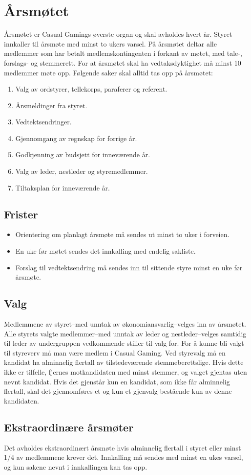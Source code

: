 \chapter{Årsmøtet}
Årsmøtet er Casual Gamings øverste organ og skal avholdes hvert år. Styret innkaller til årsmøte med minst to ukers varsel. På årsmøtet deltar alle medlemmer som har betalt medlemskontingenten i forkant av møtet, med tale-, forslags‐ og stemmerett. For at årsmøtet skal ha vedtaksdyktighet må minst 10 medlemmer møte opp. Følgende saker skal alltid tas opp på årsmøtet:
\begin{enumerate}
    \item Valg av ordstyrer, tellekorps, paraferer og referent.
    \item Årsmeldinger fra styret.
    \item Vedtektsendringer.
    \item Gjennomgang av regnskap for forrige år.
    \item Godkjenning av budsjett for inneværende år.
    \item Valg av leder, nestleder og styremedlemmer.
    \item Tiltaksplan for inneværende år.
\end{enumerate}

\section{Frister}
\begin{itemize}
    \item Orientering om planlagt årsmøte må sendes ut minst to uker i forveien.
    \item En uke før møtet sendes det innkalling med endelig sakliste.
    \item Forslag til vedtektsendring må sendes inn til sittende styre minst en uke før årsmøte.
\end{itemize}

\section{Valg}
Medlemmene av styret–med unntak av økonomiansvarlig–velges inn av årsmøtet. Alle styrets valgte medlemmer–med unntak av leder og nestleder–velges samtidig til leder av undergruppen vedkommende stiller til valg for. For å kunne bli valgt til styreverv må man være medlem i Casual Gaming. Ved styrevalg må en kandidat ha alminnelig flertall av tilstedeværende stemmeberettslige. Hvis dette ikke er tilfelle, fjernes motkandidaten med minst stemmer, og valget gjentas uten nevnt kandidat. Hvis det gjenstår kun en kandidat, som ikke får alminnelig flertall, skal det gjennomføres et og kun et gjenvalg bestående kun av denne kandidaten.

\section{Ekstraordinære årsmøter}
Det avholdes ekstraordinært årsmøte hvis alminnelig flertall i styret eller minst 1/4 av medlemmene krever det. Innkalling må sendes med minst en ukes varsel, og kun sakene nevnt i innkallingen kan tas opp.
